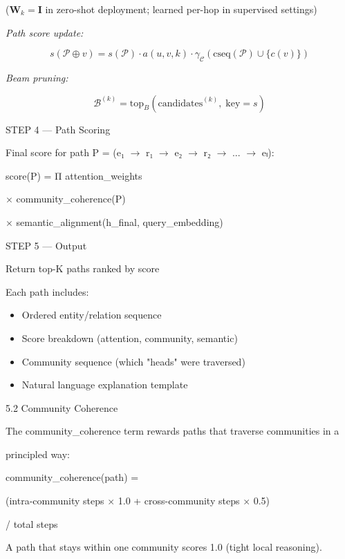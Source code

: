 \documentclass[10pt,journal,compsoc]{IEEEtran}
\begin{document}
($\mathbf{W}_k = \mathbf{I}$ in zero-shot deployment; learned per-hop in supervised settings)

\textit{Path score update:}

\begin{equation}
s(\mathcal{P} \oplus v) = s(\mathcal{P}) \cdot a(u,v,k) \cdot \gamma_{\mathcal{C}}(\mathrm{cseq}(\mathcal{P}) \cup \{c(v)\})
\end{equation}

\textit{Beam pruning:}

\begin{equation}
\mathcal{B}^{(k)} = \mathrm{top}_B\!\left(\mathrm{candidates}^{(k)},\; \text{key} = s\right)
\end{equation}

STEP 4 — Path Scoring

  Final score for path P = (e₁ $\to$ r₁ $\to$ e₂ $\to$ r₂ $\to$ ... $\to$ eₗ):

    score(P) = Π attention\_weights

             $\times$ community\_coherence(P)

             $\times$ semantic\_alignment(h\_final, query\_embedding)

STEP 5 — Output

  Return top-K paths ranked by score

  Each path includes:

\begin{itemize}
\item Ordered entity/relation sequence

\item Score breakdown (attention, community, semantic)

\item Community sequence (which "heads" were traversed)

\item Natural language explanation template

\end{itemize}
5.2 Community Coherence

The community\_coherence term rewards paths that traverse communities in a

principled way:

community\_coherence(path) =

    (intra-community steps $\times$ 1.0 + cross-community steps $\times$ 0.5)

    / total steps

A path that stays within one community scores 1.0 (tight local reasoning).
\end{document}

